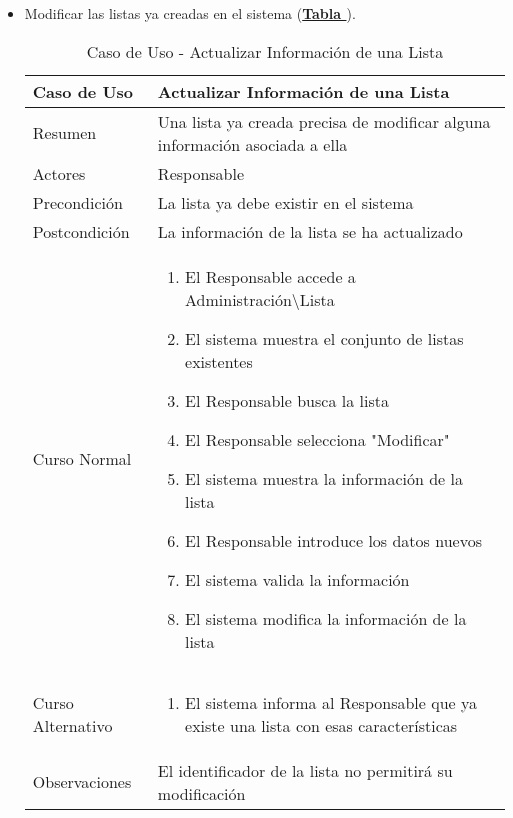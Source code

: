 \begin{itemize}
	\item \addtocounter{tabla}{1} Modificar las listas ya creadas en el sistema (\textbf{\hyperref[tab:curActualizarLista]{Tabla }}).
		\begin{table}[!htbp]
		  \centering \addtocounter{casouso}{1}
		  \begin{tabular}{|l | p{100mm}|}
		    \textbf{Caso de Uso}  & \textbf{Actualizar Información de una Lista} \\ \hline
		    Resumen 		 & Una lista ya creada precisa de modificar alguna información asociada a ella \\ \hline
		    Actores  		 & Responsable \\ \hline
		    Precondición  	 & La lista ya debe existir en el sistema  \\ \hline
		    Postcondición  	 & La información de la lista se ha actualizado \\ \hline
		    Curso Normal   	 & \begin{enumerate}
			  \item El Responsable accede a Administración\textbackslash Lista
			  \item El sistema muestra el conjunto de listas existentes
			  \item El Responsable busca la lista
			  \item El Responsable selecciona "Modificar"
			  \item El sistema muestra la información de la lista
			  \item El Responsable introduce los datos nuevos
			  \item El sistema valida la información
			  \item El sistema modifica la información de la lista
		    \end{enumerate}  \\ \hline
		    Curso Alternativo  & \begin{enumerate}
			  \item El sistema informa al Responsable que ya existe una lista con esas características
		    \end{enumerate}  \\ \hline
		    Observaciones 	 & El identificador de la lista no permitirá su modificación  \\ \hline
		  \end{tabular}
		  \caption{Caso de Uso  - Actualizar Información de una Lista}
		  \label{tab:curActualizarLista}
		\end{table}
		\FloatBarrier
		

\end{itemize}
